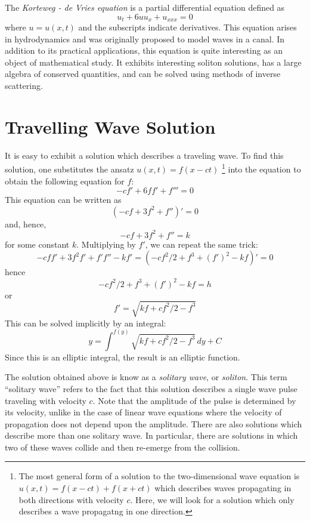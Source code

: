 \documentclass[12pt]{article}
\begin{document}

The \emph{Korteweg - de Vries equation} is a partial differential
equation defined as
\begin{equation}
u_t + 6u u_x + u_{xxx} = 0
\end{equation}
where $u = u(x,t)$ and the subscripts indicate derivatives.  This 
equation arises in hydrodynamics and was originally proposed to 
model waves in a canal. In addition to its practical applications, 
this equation is quite interesting as an object of mathematical 
study.  It exhibits interesting soliton solutions, has a large
algebra of conserved quantities, and can be solved using methods 
of inverse scattering.

\section{Travelling Wave Solution}

It is easy to exhibit a solution which describes a traveling wave.
To find this solution, one substitutes the ansatz $u(x,t)=f(x-ct)$
\footnote{The most general form of a solution to the two-dimensional
wave equation is $u(x,t) = f(x-ct) + f(x+ct)$ which describes waves 
propagating in both directions with velocity $c$.  Here, we will
look for a solution which only describes a wave propagatng in one
direction.} 
into the equation to obtain the following equation for $f$:
 \[-cf' + 6f f' + f''' = 0\]
This equation can be written as 
 \[(-cf + 3 f^2 + f'')' = 0\]
and, hence,
 \[-cf + 3 f^2 + f'' = k\]
for some constant $k$.  Multiplying by $f'$, we can repeat the same
trick:
 \[-cff' + 3 f^2 f' + f'f'' - kf' =
(-cf^2/2 + f^3 + (f')^2 - kf)' = 0\]
hence
\[-cf^2/2 + f^3 + (f')^2 - kf = h\]
or
\[f' = \sqrt{ kf + cf^2/2 - f^3}\]
This can be solved implicitly by an integral:
\[y = \int^{f(y)} \sqrt{ kf + cf^2/2 - f^3} \,dy + C\]
Since this is an elliptic integral, the result is an elliptic function.

The solution obtained above is know as a \emph{solitary wave}, or \emph{soliton}.
This term ``solitary wave'' refers to the fact that this solution describes
a single wave pulse traveling with velocity $c$.  Note that the amplitude of
the pulse is determined by its velocity, unlike in the case of linear wave 
equations where the velocity of propagation does not depend upon the amplitude.
There are also solutions which describe more than one solitary wave.  In 
particular, there are solutions in which two of these waves collide and then
re-emerge from the collision.
\end{document}
